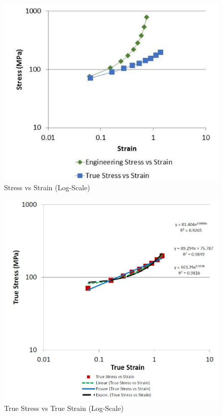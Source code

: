 \documentclass[12pt]{article}
\begin{document}
\begin{figure}[h!]  
  \centering
    \includegraphics[width=\linewidth]{stress_vs_strain_log.JPG}
    \caption{Stress vs Strain (Log-Scale)}
\end{figure}

\newpage

\begin{figure}[h!]  
  \centering
    \includegraphics[width=\linewidth]{truestress_vs_truestrain_log.JPG}
    \caption{True Stress vs True Strain (Log-Scale)}
\end{figure}
\bigskip
\bigskip
\bigskip
\end{document}
